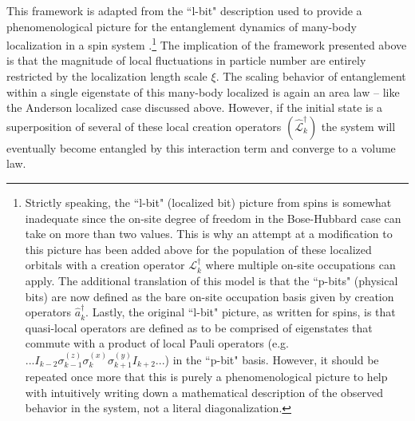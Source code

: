 This framework is adapted from the ``l-bit" description used to provide a phenomenological picture for the entanglement dynamics of many-body localization in a spin system \cite{Serbyn2013a,Serbyn2013b,Huse2014}.\footnote{Strictly speaking, the ``l-bit" (localized bit) picture from spins is somewhat inadequate since the on-site degree of freedom in the Bose-Hubbard case can take on more than two values. This is why an attempt at a modification to this picture has been added above for the population of these localized orbitals with a creation operator $\mathcal{L}^\dagger_k$ where multiple on-site occupations can apply. The additional translation of this model is that the ``p-bits" (physical bits) are now defined as the bare on-site occupation basis given by creation operators $\hat{a}^\dagger_k$. Lastly, the original ``l-bit" picture, as written for spins, is that quasi-local operators are defined as to be comprised of eigenstates that commute with a product of local Pauli operators (e.g. $... I_{k-2} \sigma_{k-1}^{(z)} \sigma_{k}^{(x)} \sigma_{k+1}^{(y)} I_{k+2} ...$) in the ``p-bit" basis. However, it should be repeated once more that this is purely a phenomenological picture to help with intuitively writing down a mathematical description of the observed behavior in the system, not a literal diagonalization.} The implication of the framework presented above is that the magnitude of local fluctuations in particle number are entirely restricted by the localization length scale $\xi$. The scaling behavior of entanglement within a single eigenstate of this many-body localized is again an area law -- like the Anderson localized case discussed above. However, if the initial state is a superposition of several of these local creation operators $(\hat{\mathcal{L}}^\dagger_k)$ the system will eventually become entangled by this interaction term and converge to a volume law.

